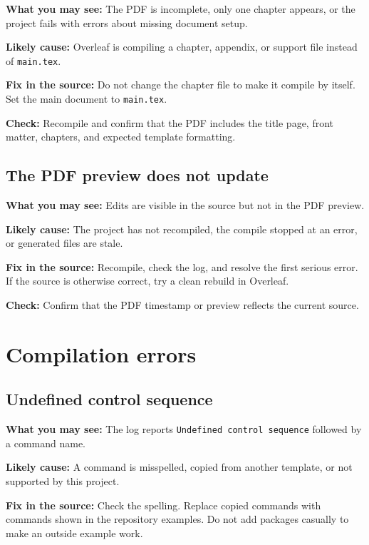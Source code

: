 \textbf{What you may see:} The PDF is incomplete, only one chapter appears, or the project fails with errors about missing document setup.

\textbf{Likely cause:} Overleaf is compiling a chapter, appendix, or support file instead of \texttt{main.tex}.

\textbf{Fix in the source:} Do not change the chapter file to make it compile by itself. Set the main document to \texttt{main.tex}.

\textbf{Check:} Recompile and confirm that the PDF includes the title page, front matter, chapters, and expected template formatting.

\subsection{The PDF preview does not update}
\label{subsec:pdf-preview-does-not-update}

\textbf{What you may see:} Edits are visible in the source but not in the PDF preview.

\textbf{Likely cause:} The project has not recompiled, the compile stopped at an error, or generated files are stale.

\textbf{Fix in the source:} Recompile, check the log, and resolve the first serious error. If the source is otherwise correct, try a clean rebuild in Overleaf.

\textbf{Check:} Confirm that the PDF timestamp or preview reflects the current source.

\section{Compilation errors}
\label{sec:compilation-errors}

\subsection{Undefined control sequence}
\label{subsec:undefined-control-sequence}

\textbf{What you may see:} The log reports \texttt{Undefined control sequence} followed by a command name.

\textbf{Likely cause:} A command is misspelled, copied from another template, or not supported by this project.

\textbf{Fix in the source:} Check the spelling. Replace copied commands with commands shown in the repository examples. Do not add packages casually to make an outside example work.

